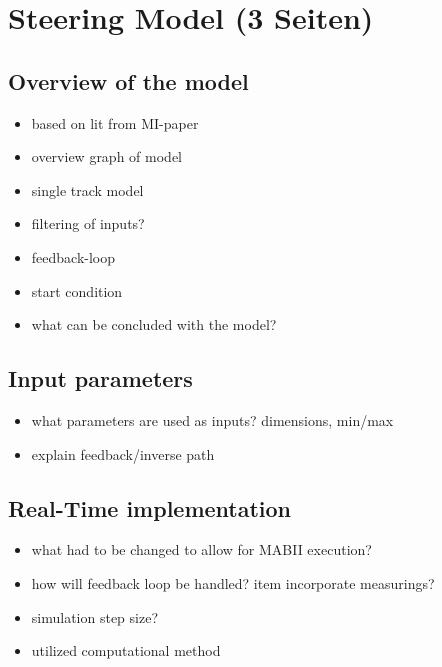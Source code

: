 \documentclass[ExampleMasters.tex]{subfiles}
\begin{document}
\clearpage
\chapter{Steering Model (3 Seiten)}
\label{chap:steering_model}

\section{Overview of the model}
\label{sec:overview_of_the_model}
			
\begin{itemize}
	\item based on lit from MI-paper 
	\item overview graph of model
	\item single track model
	
	\item filtering of inputs?
	\item feedback-loop
	\item start condition
	\item what can be concluded with the model?
\end{itemize}

\section{Input parameters}
\label{sec:input_parameters}

\begin{itemize}
	\item what parameters are used as inputs? dimensions, min/max
	\item explain feedback/inverse path
	
\end{itemize}

\section{Real-Time implementation}
\label{sec:real_time_implementation}

\begin{itemize}
	\item what had to be changed to allow for MABII execution?
	\item how will feedback loop be handled?
	item incorporate measurings?
	\item simulation step size?
	\item utilized computational method
\end{itemize}
\end{document}
